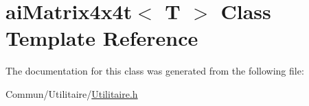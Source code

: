 \hypertarget{classai_matrix4x4t}{}\section{ai\+Matrix4x4t$<$ T $>$ Class Template Reference}
\label{classai_matrix4x4t}


The documentation for this class was generated from the following file\+:\begin{DoxyCompactItemize}
\item 
Commun/\+Utilitaire/\hyperlink{_utilitaire_8h}{Utilitaire.\+h}\end{DoxyCompactItemize}
